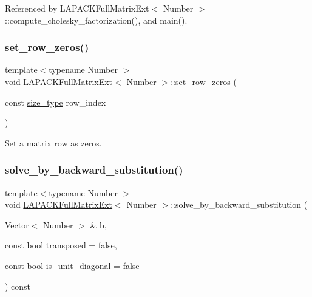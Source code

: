 Referenced by L\+A\+P\+A\+C\+K\+Full\+Matrix\+Ext$<$ Number $>$\+::compute\+\_\+cholesky\+\_\+factorization(), and main().

\mbox{\label{classLAPACKFullMatrixExt_abf191c72c4a8813470f32c6107f2ffbc}} 
\subsubsection{\texorpdfstring{set\+\_\+row\+\_\+zeros()}{set\_row\_zeros()}}
{\footnotesize\ttfamily template$<$typename Number $>$ \\
void \hyperlink{classLAPACKFullMatrixExt}{L\+A\+P\+A\+C\+K\+Full\+Matrix\+Ext}$<$ Number $>$\+::set\+\_\+row\+\_\+zeros (\begin{DoxyParamCaption}\item[{const \hyperlink{classLAPACKFullMatrixExt_a5cf5f4a6104dc17029210b5ca52bf574}{size\+\_\+type}}]{row\+\_\+index }\end{DoxyParamCaption})}

Set a matrix row as zeros. \mbox{\label{classLAPACKFullMatrixExt_ac36f444148f8a0d3972867a0e79f887e}} 
\subsubsection{\texorpdfstring{solve\+\_\+by\+\_\+backward\+\_\+substitution()}{solve\_by\_backward\_substitution()}\hspace{0.1cm}{\footnotesize\ttfamily [1/2]}}
{\footnotesize\ttfamily template$<$typename Number $>$ \\
void \hyperlink{classLAPACKFullMatrixExt}{L\+A\+P\+A\+C\+K\+Full\+Matrix\+Ext}$<$ Number $>$\+::solve\+\_\+by\+\_\+backward\+\_\+substitution (\begin{DoxyParamCaption}\item[{Vector$<$ Number $>$ \&}]{b,  }\item[{const bool}]{transposed = {\ttfamily false},  }\item[{const bool}]{is\+\_\+unit\+\_\+diagonal = {\ttfamily false} }\end{DoxyParamCaption}) const}


